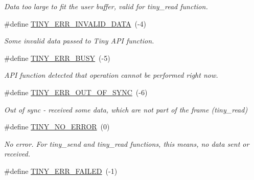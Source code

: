 \begin{DoxyCompactItemize}
\begin{DoxyCompactList}\small\item\em Data too large to fit the user buffer, valid for tiny\+\_\+read function. \end{DoxyCompactList}\item 
\hypertarget{group__ERROR__FLAGS_ga541a9e67a84e39595ad647d641c4df2e}{}\#define \hyperlink{group__ERROR__FLAGS_ga541a9e67a84e39595ad647d641c4df2e}{T\+I\+N\+Y\+\_\+\+E\+R\+R\+\_\+\+I\+N\+V\+A\+L\+I\+D\+\_\+\+D\+A\+T\+A}~(-\/4)\label{group__ERROR__FLAGS_ga541a9e67a84e39595ad647d641c4df2e}

\begin{DoxyCompactList}\small\item\em Some invalid data passed to Tiny A\+P\+I function. \end{DoxyCompactList}\item 
\hypertarget{group__ERROR__FLAGS_ga9b3e170e1c6ce269f216ef4a1ac61995}{}\#define \hyperlink{group__ERROR__FLAGS_ga9b3e170e1c6ce269f216ef4a1ac61995}{T\+I\+N\+Y\+\_\+\+E\+R\+R\+\_\+\+B\+U\+S\+Y}~(-\/5)\label{group__ERROR__FLAGS_ga9b3e170e1c6ce269f216ef4a1ac61995}

\begin{DoxyCompactList}\small\item\em A\+P\+I function detected that operation cannot be performed right now. \end{DoxyCompactList}\item 
\hypertarget{group__ERROR__FLAGS_gae1949de45d9c478830dad9c9b996193a}{}\#define \hyperlink{group__ERROR__FLAGS_gae1949de45d9c478830dad9c9b996193a}{T\+I\+N\+Y\+\_\+\+E\+R\+R\+\_\+\+O\+U\+T\+\_\+\+O\+F\+\_\+\+S\+Y\+N\+C}~(-\/6)\label{group__ERROR__FLAGS_gae1949de45d9c478830dad9c9b996193a}

\begin{DoxyCompactList}\small\item\em Out of sync -\/ received some data, which are not part of the frame (tiny\+\_\+read) \end{DoxyCompactList}\item 
\hypertarget{group__ERROR__FLAGS_ga69c869a686b67bf0b7b8115599515d61}{}\#define \hyperlink{group__ERROR__FLAGS_ga69c869a686b67bf0b7b8115599515d61}{T\+I\+N\+Y\+\_\+\+N\+O\+\_\+\+E\+R\+R\+O\+R}~(0)\label{group__ERROR__FLAGS_ga69c869a686b67bf0b7b8115599515d61}

\begin{DoxyCompactList}\small\item\em No error. For tiny\+\_\+send and tiny\+\_\+read functions, this means, no data sent or received. \end{DoxyCompactList}\item 
\hypertarget{group__ERROR__FLAGS_ga84e6ca143550038e1a71cf36078d1926}{}\#define \hyperlink{group__ERROR__FLAGS_ga84e6ca143550038e1a71cf36078d1926}{T\+I\+N\+Y\+\_\+\+E\+R\+R\+\_\+\+F\+A\+I\+L\+E\+D}~(-\/1)\label{group__ERROR__FLAGS_ga84e6ca143550038e1a71cf36078d1926}


\end{DoxyCompactItemize}
